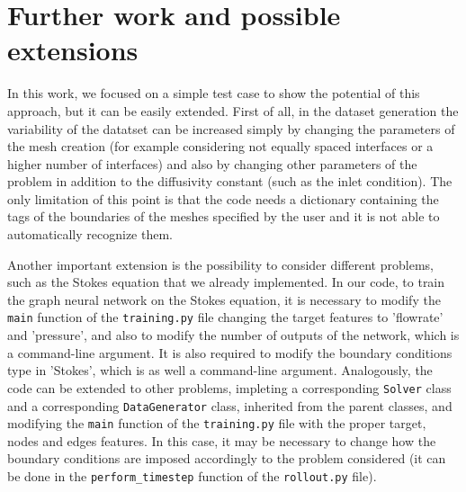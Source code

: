 \documentclass[11pt,a4paper]{article}
\begin{document}


\section{Further work and possible extensions}
In this work, we focused on a simple test case to show the potential of this approach, but it can be easily extended. First of all, in the dataset generation the variability of the datatset can be increased simply by changing the parameters of the mesh creation (for example considering not equally spaced interfaces or a higher number of interfaces) and also by changing other parameters of the problem in addition to the diffusivity constant (such as the inlet condition). 
The only limitation of this point is that the code needs a dictionary containing the tags of the boundaries of the meshes specified by the user and it is not able to automatically recognize them. 

Another important extension is the possibility to consider different problems, such as the Stokes equation that we already implemented. In our code, to train the graph neural network on the Stokes equation, it is necessary to modify the \texttt{main} function of the \texttt{training.py} file changing the target features to 'flowrate' and 'pressure', and also to modify the number of outputs of the network, which is a command-line argument. It is also required to modify the boundary conditions type in 'Stokes', which is as well a command-line argument.
Analogously, the code can be extended to other problems, impleting a corresponding \texttt{Solver} class and a corresponding \texttt{DataGenerator} class, inherited from the parent classes, and modifying the \texttt{main} function of the \texttt{training.py} file with the proper target, nodes and edges features. In this case, it may be necessary to change how the boundary conditions are imposed accordingly to the problem considered (it can be done in the \texttt{perform\_timestep} function of the \texttt{rollout.py} file). 

\newpage
\end{document}

